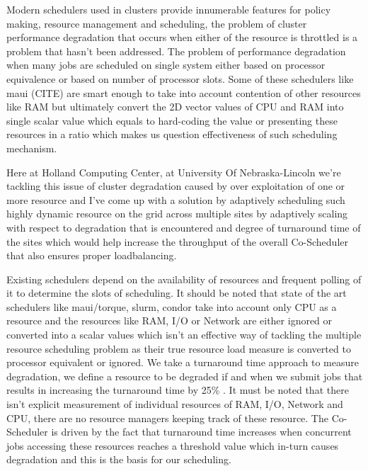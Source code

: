 \documentclass[ms,electronic,double]{nuthesis}
\begin{document}
Modern schedulers used in clusters provide innumerable features for policy making, resource management 
and scheduling, the problem of cluster 
performance degradation that occurs when either of the resource is throttled is a problem that hasn't been 
addressed. The problem of performance degradation when many jobs are scheduled on single system 
either based on processor equivalence or based on number of processor slots. Some of 
these schedulers like maui (CITE) are smart enough to take into account contention of other 
resources like RAM but ultimately convert the 2D vector values of CPU and RAM 
into single scalar value which equals to hard-coding the value or presenting these resources
in a ratio which makes us question effectiveness of such scheduling mechanism. 

Here at Holland Computing Center, at University Of Nebraska-Lincoln we're 
tackling this issue of cluster degradation caused by 
over exploitation of one or more resource and I've come up with a solution by adaptively scheduling 
such highly dynamic resource on the grid across multiple sites by adaptively scaling with respect to
degradation that is encountered and degree of turnaround time of the sites which would help increase 
the throughput of the overall Co-Scheduler that also ensures proper loadbalancing.

Existing schedulers depend on the availability of resources and frequent polling 
of it to determine the slots of scheduling. It should be noted that state of the art 
schedulers like maui/torque, slurm, condor take into account only CPU as a 
resource and the resources like RAM, I/O or Network are either ignored or 
converted into a scalar values which isn't an effective way of tackling the multiple resource scheduling 
problem as their true resource load measure is converted to processor equivalent or ignored. 
We take a turnaround time approach to measure degradation, we define a resource 
to be degraded if and when we submit jobs that results in increasing the 
turnaround time by 25\% . It must be 
noted that there isn't explicit measurement of individual resources of RAM, I/O, 
Network and CPU, there are no resource managers keeping track of these resource. 
The Co-Scheduler is driven by the fact that turnaround time increases when 
concurrent jobs accessing these resources reaches a threshold value which in-turn causes 
degradation and this is the basis for our scheduling.
\end{document}
